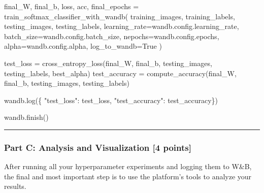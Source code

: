 \documentclass[
  letterpaper,
  DIV=11,
  numbers=noendperiod]{scrartcl}
\newenvironment{Shaded}{\begin{snugshade}}{\end{snugshade}}
\newcommand{\NormalTok}[1]{\textcolor[rgb]{0.00,0.23,0.31}{#1}}
\newcommand{\OperatorTok}[1]{\textcolor[rgb]{0.37,0.37,0.37}{#1}}
\newcommand{\StringTok}[1]{\textcolor[rgb]{0.13,0.47,0.30}{#1}}
\newcommand{\VariableTok}[1]{\textcolor[rgb]{0.07,0.07,0.07}{#1}}
\begin{document}
\begin{Shaded}
\begin{Highlighting}[]
\NormalTok{final\_W, final\_b, loss, acc, final\_epochs }\OperatorTok{=}\NormalTok{ train\_softmax\_classifier\_with\_wandb(}
\NormalTok{   training\_images, training\_labels, testing\_images, testing\_labels,}
\NormalTok{   learning\_rate}\OperatorTok{=}\NormalTok{wandb.config.learning\_rate,}
\NormalTok{   batch\_size}\OperatorTok{=}\NormalTok{wandb.config.batch\_size,}
\NormalTok{   nepochs}\OperatorTok{=}\NormalTok{wandb.config.epochs,}
\NormalTok{   alpha}\OperatorTok{=}\NormalTok{wandb.config.alpha,}
\NormalTok{   log\_to\_wandb}\OperatorTok{=}\VariableTok{True}
\NormalTok{)}

\NormalTok{test\_loss }\OperatorTok{=}\NormalTok{ cross\_entropy\_loss(final\_W, final\_b, testing\_images, testing\_labels, best\_alpha)}
\NormalTok{test\_accuracy }\OperatorTok{=}\NormalTok{ compute\_accuracy(final\_W, final\_b, testing\_images, testing\_labels)}

\NormalTok{wandb.log(\{}
   \StringTok{"test\_loss"}\NormalTok{: test\_loss,}
   \StringTok{"test\_accuracy"}\NormalTok{: test\_accuracy\})}

\NormalTok{wandb.finish()}
\end{Highlighting}
\end{Shaded}

\begin{center}\rule{0.5\linewidth}{0.5pt}\end{center}

\subsubsection{Part C: Analysis and Visualization {[}4
points{]}}\label{part-c-analysis-and-visualization-4-points}

After running all your hyperparameter experiments and logging them to
W\&B, the final and most important step is to use the platform's tools
to analyze your results.
\end{document}
